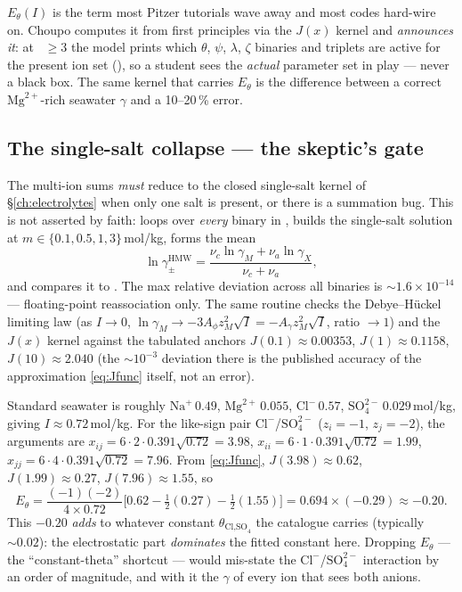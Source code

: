 \documentclass[11pt,a4paper]{article}
\begin{document}
\begin{keyidea}
$E_\theta(I)$ is the term most Pitzer tutorials wave away and most codes
hard-wire on.  Choupo computes it from first principles via the $J(x)$
kernel and \emph{announces it}: at ~$\ge 3$ the model
prints which $\theta$, $\psi$, $\lambda$, $\zeta$ binaries and triplets
are active for the present ion set (), so a
student sees the \emph{actual} parameter set in play --- never a black
box.  The same kernel that carries $E_\theta$ is the difference between a
correct $\text{Mg}^{2+}$-rich seawater $\gamma$ and a 10--20\,\% error.
\end{keyidea}

\subsection{The single-salt collapse --- the skeptic's gate}

The multi-ion sums \emph{must} reduce to the closed single-salt kernel
of \S\ref{ch:electrolytes} when only one salt is present, or there is a
summation bug.  This is not asserted by faith: 
loops over \emph{every} binary in , builds the
single-salt solution at $m\in\{0.1,0.5,1,3\}$\,mol/kg, forms the mean
\begin{equation}
   \ln\gamma_\pm^{\text{HMW}}
   = \frac{\nu_c\ln\gamma_M + \nu_a\ln\gamma_X}{\nu_c+\nu_a},
\end{equation}
and compares it to .  The max relative
deviation across all binaries is $\sim 1.6\times10^{-14}$ ---
floating-point reassociation only.  The same routine checks the
Debye--H\"uckel limiting law (as $I\to0$,
$\ln\gamma_M\to -3A_\phi z_M^2\sqrt I = -A_\gamma z_M^2\sqrt I$, ratio
$\to1$) and the $J(x)$ kernel against the tabulated anchors
$J(0.1)\approx0.00353$, $J(1)\approx0.1158$, $J(10)\approx2.040$ (the
$\sim10^{-3}$ deviation there is the published accuracy of the
approximation \eqref{eq:Jfunc} itself, not an error).

\begin{example}
Standard seawater is roughly $\text{Na}^+\,0.49$, $\text{Mg}^{2+}\,0.055$,
$\text{Cl}^-\,0.57$, $\text{SO}_4^{2-}\,0.029$\,mol/kg, giving
$I\approx0.72$\,mol/kg.  For the like-sign pair
$\text{Cl}^-$/$\text{SO}_4^{2-}$ ($z_i=-1$, $z_j=-2$), the arguments are
$x_{ij}=6\cdot2\cdot0.391\sqrt{0.72}=3.98$,
$x_{ii}=6\cdot1\cdot0.391\sqrt{0.72}=1.99$,
$x_{jj}=6\cdot4\cdot0.391\sqrt{0.72}=7.96$.  From \eqref{eq:Jfunc},
$J(3.98)\approx0.62$, $J(1.99)\approx0.27$, $J(7.96)\approx1.55$, so
\[
   E_{\theta} = \frac{(-1)(-2)}{4\times0.72}
   \bigl[0.62 - \tfrac12(0.27) - \tfrac12(1.55)\bigr]
   = 0.694\times(-0.29) \approx -0.20 .
\]
This $-0.20$ \emph{adds} to whatever constant $\theta_{\text{Cl,SO}_4}$
the catalogue carries (typically $\sim 0.02$): the electrostatic part
\emph{dominates} the fitted constant here.  Dropping $E_\theta$ --- the
``constant-theta'' shortcut --- would mis-state the
$\text{Cl}^-$/$\text{SO}_4^{2-}$ interaction by an order of magnitude,
and with it the $\gamma$ of every ion that sees both anions.
\end{example}
\end{document}
